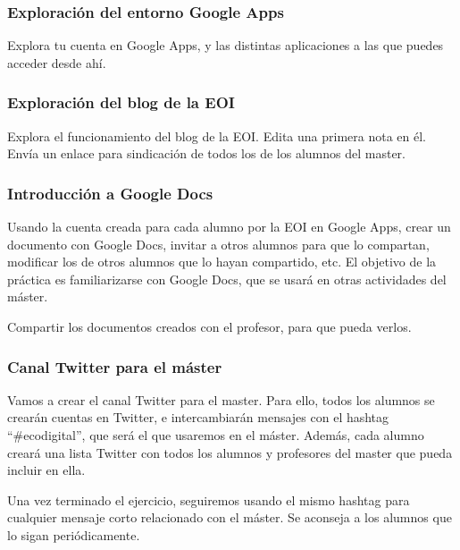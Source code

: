 \documentclass[a4paper,12pt]{article}
\begin{document}
\subsubsection{Exploración del entorno Google Apps}
\label{sub:googleapps}

Explora tu cuenta en Google Apps, y las distintas aplicaciones a las que puedes acceder desde ahí.

\subsubsection{Exploración del blog de la EOI}
\label{sub:blog}

Explora el funcionamiento del blog de la EOI. Edita una primera nota en él. Envía un enlace para sindicación de todos los de los alumnos del master.

\subsubsection{Introducción a Google Docs}
\label{sub:googledocs}

Usando la cuenta creada para cada alumno por la EOI en Google Apps, crear un documento con Google Docs, invitar a otros alumnos para que lo compartan, modificar los de otros alumnos que lo hayan compartido, etc. El objetivo de la práctica es familiarizarse con Google Docs, que se usará en otras actividades del máster.

Compartir los documentos creados con el profesor, para que pueda verlos.

\subsubsection{Canal Twitter para el máster}
\label{sub:canaltwitter}

Vamos a crear el canal Twitter para el master. Para ello, todos los alumnos se crearán cuentas en Twitter, e intercambiarán mensajes con el hashtag ``\#ecodigital'', que será el que usaremos en el máster. Además, cada alumno creará una lista Twitter con todos los alumnos y profesores del master que pueda incluir en ella.

Una vez terminado el ejercicio, seguiremos usando el mismo hashtag para cualquier mensaje corto relacionado con el máster. Se aconseja a los alumnos que lo sigan periódicamente.
\end{document}
